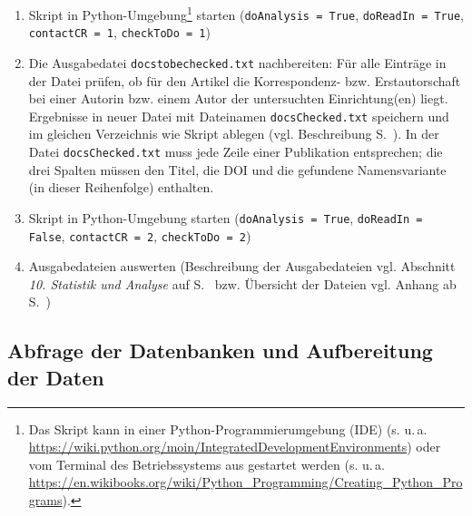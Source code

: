 \begin{enumerate}
\begin{compactitem}
	\end{compactitem}
\item \label{runscript} Skript in Python-Umgebung\footnote{Das Skript kann in einer Python-Programmierumgebung (IDE) (s. u.\,a. \url{https://wiki.python.org/moin/IntegratedDevelopmentEnvironments}) oder vom Terminal des Betriebssystems aus gestartet werden (s. u.\,a. \url{https://en.wikibooks.org/wiki/Python_Programming/Creating_Python_Programs}).} starten \newline
(\texttt{doAnalysis = True}, \texttt{doReadIn = True}, \texttt{contactCR = 1}, \texttt{checkToDo = 1})
\item Die Ausgabedatei \texttt{docstobechecked.txt} nachbereiten: Für alle Einträge in der Datei prüfen, ob für den Artikel die Korrespondenz- bzw. Erstautorschaft bei einer Autorin bzw. einem Autor der untersuchten Einrichtung(en) liegt. Ergebnisse in neuer Datei mit Dateinamen \texttt{docsChecked.txt} speichern und im gleichen Verzeichnis wie Skript ablegen (vgl. Beschreibung S.~\pageref{func-corr-author}). In der Datei \texttt{docsChecked.txt} %
muss jede Zeile einer Publikation entsprechen; die drei Spalten müssen den Titel, die DOI und die gefundene Namensvariante (in dieser Reihenfolge) enthalten.
\item \label{runscript2} Skript in Python-Umgebung starten \newline
(\texttt{doAnalysis = True}, \texttt{doReadIn = False}, \texttt{contactCR = 2}, \texttt{checkToDo = 2})
\item Ausgabedateien auswerten (Beschreibung der Ausgabedateien vgl. Abschnitt \textit{10. Statistik und Analyse} auf S.~\pageref{analyse} bzw. Übersicht der Dateien vgl. Anhang ab S.~\pageref{appendix})
\end{enumerate}

\subsection{Abfrage der Datenbanken und Aufbereitung der Daten}
\label{Datenerhebung}

